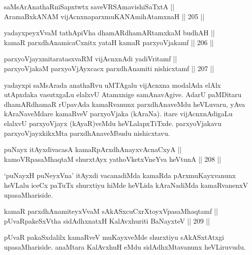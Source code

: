 
\begin{shl}
saMsArAnathaRniSapxtwtx saveVRSAmavishiSaTxtA || \\
AramaBxkANAM vijAcnxnaparxmuKANAmihA\s \s tamxnaH \hfill || 205 ||  
\end{shl}

\begin{shl}
yadayxpeyxVvaM tathA\s piVha dhamARdhamARtamxkaM budhAH || \\
kamaR parxdhAnamicaCxnitx yataH kamaR parxyoVjakamf \hfill || 206 ||  
\end{shl}

\begin{shl}
parxyoVjayxmitaratasxvaRM vijAcnxnAdi yadiVritamf ||  \\
parxyoVjakaM parxyoVjAyxcacx parxdhAnamiti nishicxtamf \hfill || 207 ||  
\end{shl}

\begin{artha}
yadayxpi saMsArada anathaRvu uMTAgalu vijAcnxna modalAda elAlx
utApxdaka vasutxgaLu elalxvU Atamxnige samAnavAgive. AdarU paMDitaru
dhamARdhamaR rUpavAda kamaRvanunx parxdhAnaveMdu heVLuvaru, yAva
kAraNaveMdare kamaRveV parxyoVjaka (kAraNa). itare vijAcnxnAdigaLu
elalxvU parxyoVjayx (kAyaR)veMdu heVLalapxTiTxde. parxyoVjakavu
parxyoVjayxkikxMta parxdhAnaveMbudu nishicxtavu.
\end{artha}

\begin{shl}
puNayx itAyxdivacasA kamaRpArxdhAnayxvAcnaCxyA || \\
kamoVRpasaMhaqtaM shurxtAyx yathoVketxVneYva heVtunA \hfill || 208 ||  
\end{shl}

\begin{artha}
`puNayxH puNeyxVna' itAyxdi vacanadiMda kamaRda pArxmuKayxvanunx
heVLalu iceCx paTuTx shurxtiyu hiMde heVLida kAraNadiMda
kamaRvanenxV upasaMhariside.
\end{artha}

\begin{shl}
kamaR parxdhAnamiteyxVvaM sAkASxcuCxrXtoyxVpasaMhaqtamf || \\
pUvaRpakeSxV\s tha sidAdhxnatxH KalAvxhuriti BaNayxteV \hfill || 209 ||  
\end{shl}

\begin{artha}
pUvaR pakaSxdalilx kamaRveV muKayxveMde shurxtiyu sAkASxtAtxgi
upasaMhariside. anaMtara KalAvxhuH eMdu sidAdhxMtavanunx heVLiruvudu.
\end{artha}


